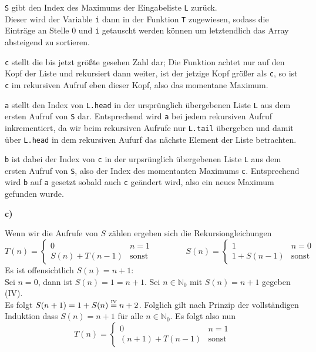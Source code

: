 \documentclass[a4paper,graphics,11pt]{article}
\newcommand{\up}[2]{\mathrel{\overset{\makebox[0pt]{\mbox{\normalfont\tiny #2}}}{#1}}}
\begin{document}
\texttt{S} gibt den Index des Maximums der Eingabeliste \texttt{L} zurück.\\
Dieser wird der Variable \texttt{i} dann in der Funktion \texttt{T} zugewiesen, sodass die Einträge
an Stelle 0 und \texttt{i} getauscht werden können um letztendlich das Array absteigend zu sortieren.

\texttt{c} stellt die bis jetzt größte gesehen Zahl dar; Die Funktion achtet nur auf den
Kopf der Liste und rekursiert dann weiter, ist der jetzige Kopf größer als \texttt{c}, so ist
\texttt{c} im rekursiven Aufruf eben dieser Kopf, also das momentane Maximum.

\texttt{a} stellt den Index von \texttt{L.head} in der ursprünglich übergebenen Liste \texttt{L} aus dem
ersten Aufruf von \texttt{S} dar. Entsprechend wird \texttt{a} bei jedem rekursiven Aufruf inkrementiert,
da wir beim rekursiven Aufrufe nur \texttt{L.tail} übergeben und damit über \texttt{L.head} in dem
rekursiven Aufurf das nächste Element der Liste betrachten.

\texttt{b} ist dabei der Index von \texttt{c} in der urpsrünglich übergebenen Liste \texttt{L} aus dem
ersten Aufruf von \texttt{S}, also der Index des momentanten Maximums \texttt{c}.
Entsprechend wird \texttt{b} auf \texttt{a} gesetzt sobald auch
\texttt{c} geändert wird, also ein neues Maximum gefunden wurde.

\textbf{c)}

Wenn wir die Aufrufe von $S$ zählen ergeben sich die Rekursiongleichungen
$$
    T(n) = \begin{cases}
        0 & n = 1\\
        S(n) + T(n-1)& \text{sonst}
    \end{cases}
    \qquad\qquad
    S(n) = \begin{cases}
        1 & n = 0\\
        1 + S(n-1)& \text{sonst}
    \end{cases}
$$
Es ist offensichtlich $S(n) = n+1$:\\
Sei $n = 0$, dann ist $S(n) = 1 = n+1$. Sei $n \in \mathbb{N}_0$ mit $S(n) = n+1$ gegeben (IV).\\
Es folgt $S(n+1) = 1 + S(n) \up{=}{IV} n+2$. Folglich gilt nach Prinzip der vollständigen Induktion
dass $S(n) = n+1$ für alle $n \in \mathbb{N}_0$.
Es folgt also nun
$$
    T(n) = \begin{cases}
        0 & n = 1\\
        (n + 1) + T(n-1)& \text{sonst}
    \end{cases}
$$
\end{document}

